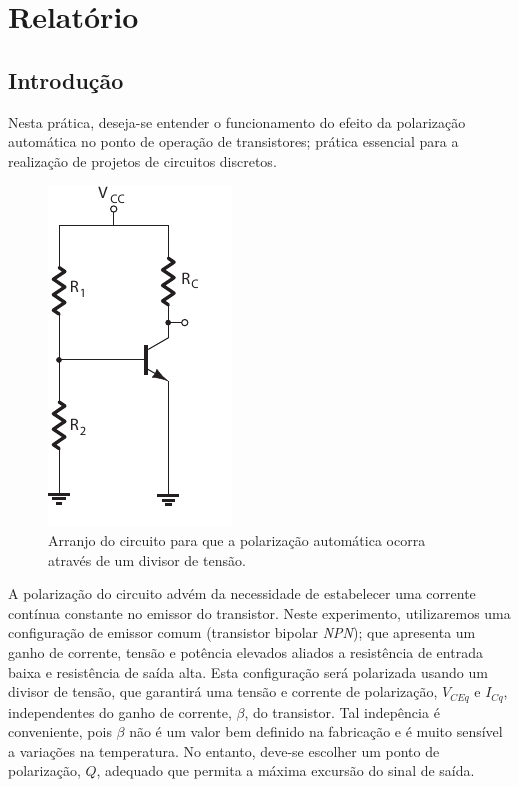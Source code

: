 \documentclass[12pt,a4paper]{article}
\begin{document}
\setcounter{figure}{1}
\setcounter{section}{2}
\setcounter{page}{6}
\section{Relatório}
\subsection{Introdução}

Nesta prática, deseja-se entender o funcionamento  do efeito da polarização 
automática no ponto de operação de transistores; prática essencial para a realização 
de projetos de circuitos discretos.\\

\begin{figure}[htpb]
  \centering
  \includegraphics[width=0.3\linewidth]{./img/divisortensao.pdf}
  \caption{Arranjo do circuito para que a polarização automática ocorra através de um divisor de tensão.}
  \label{fig:divisortensao}
\end{figure}

A polarização do circuito advém da necessidade de estabelecer uma corrente contínua 
constante no emissor do transistor. Neste experimento, 
utilizaremos uma configuração de emissor comum (transistor bipolar \emph{NPN}); que apresenta um ganho de corrente, 
tensão e potência elevados aliados a resistência de entrada baixa
e resistência de saída alta. Esta configuração será polarizada usando um divisor de tensão,
que garantirá uma tensão e corrente de polarização,
$V_{CEq}$ e $I_{Cq}$, independentes do ganho de corrente, $\beta$, do transistor.
Tal indepência é conveniente, pois $\beta$ 
não é um valor bem definido na fabricação e é muito sensível a variações na temperatura.
No entanto, deve-se escolher um ponto de polarização, $Q$, adequado que permita a 
máxima excursão do sinal de saída.
\end{document}

